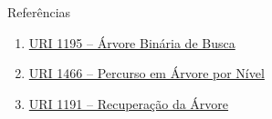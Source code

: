 \begin{frame}[fragile]{Referências}

    \begin{enumerate}
        \item \href{https://www.urionlinejudge.com.br/judge/pt/problems/view/1195}{URI 1195 -- Árvore Binária de Busca}

        \item \href{https://www.urionlinejudge.com.br/judge/pt/problems/view/1466}{URI 1466 -- Percurso em Árvore por Nível}

        \item \href{https://www.urionlinejudge.com.br/judge/pt/problems/view/1191}{URI 1191 -- Recuperação da Árvore}

    \end{enumerate}

\end{frame}
